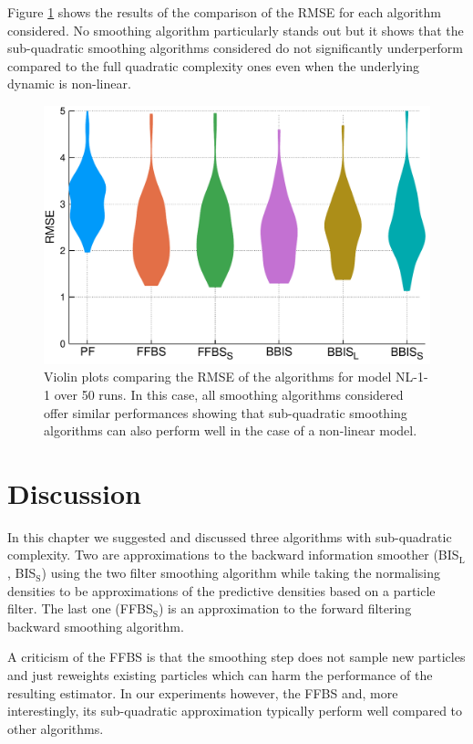 Figure \ref{comp-nl-1} shows the results of the comparison of the RMSE for each algorithm considered. No smoothing algorithm particularly stands out but it shows that the sub-quadratic smoothing algorithms considered do not significantly underperform compared to the full quadratic complexity ones even when the underlying dynamic is non-linear.

\begin{figure}[!h]
\center
\includegraphics[width=.75\textwidth]{figures/tfs/comp_nl1_N50}
\caption{\label{comp-nl-1}Violin plots comparing the RMSE of the algorithms for model NL-1-1 over 50 runs. In this case, all smoothing algorithms considered offer similar performances showing that sub-quadratic smoothing algorithms can also perform well in the case of a non-linear model.}
\end{figure}



\section{Discussion}

In this chapter we suggested and discussed three algorithms with sub-quadratic complexity. 
Two are approximations to the backward information smoother (BIS$_{\text{L}}$, BIS$_{\text{S}}$) using the two filter smoothing algorithm while taking the normalising densities to be approximations of the predictive densities based on a particle filter. 
The last one (FFBS$_{\text{S}}$) is an approximation to the forward filtering backward smoothing algorithm. 

A criticism of the FFBS is that the smoothing step does not sample new particles and just reweights existing particles which can harm the performance of the resulting estimator. In our experiments however, the FFBS and, more interestingly, its sub-quadratic approximation typically perform well compared to other algorithms. 

